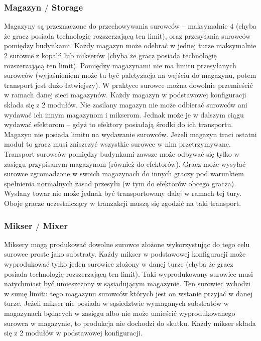 \documentclass[11pt,a4paper]{article}
\begin{document}
\subsubsection{Magazyn $/$ Storage}

Magazyny są przeznaczone do przechowywania surowców -- maksymalnie 4 (chyba że gracz posiada technologię rozszerzającą ten limit), oraz przesyłania surowców pomiędzy budynkami. Każdy magazyn może odebrać w jednej turze maksymalnie 2 surowce z kopalń lub mikserów (chyba że gracz posiada technologię rozszerzającą ten limit). Pomiędzy magazynami nie ma limitu przesyłanych surowców (wyjaśnieniem może tu być paletyzacja na wejściu do magazynu, potem transport jest dużo łatwiejszy). W praktyce surowce można dowolnie przemieścić w ramach danej sieci magazynów. Każdy magazyn w podstawowej konfiguracji składa się z 2 modułów. Nie zasilany magazyn nie może odbierać surowców ani wydawać ich innym magazynom i mikserom. Jednak może je w dalszym ciągu wydawać efektorom -- gdyż to efektory posiadają środki do ich transportu. Magazyn nie posiada limitu na wydawanie surowców. Jeżeli magazyn traci ostatni moduł to gracz musi zniszczyć wszystkie surowce w nim przetrzymywane. Transport surowców pomiędzy budynkami zawsze może odbywać się tylko w zasięgu przypisanym magazynom (również do efektorów). Gracz może wysyłać surowce zgromadzone w swoich magazynach do innych graczy pod warunkiem spełnienia normalnych zasad przesyłu (w tym do efektorów obcego gracza). Wysłany towar nie może jednak być transportowany dalej w ramach tej tury. Oboje gracze uczestniczący w tranzakcji muszą się zgodzić na taki transport.

\subsubsection{Mikser $/$ Mixer}

Miksery mogą produkować dowolne surowce złożone wykorzystując do tego celu surowce proste jako substraty. Każdy mikser w podstawowej konfiguracji może wyprodukować tylko jeden surowiec złożony w danej turze (chyba że gracz posiada technologię rozszerzającą ten limit). Taki wyprodukowany surowiec musi natychmiast być umieszczony w sąsiadującym magazynie. Ten surowiec wchodzi w sumę limitu tego magazynu surowców których jest on wstanie przyjać w danej turze. Jeżeli mikser nie posiada w sąsiedztwie wymaganych substratów w magazynach będących w zasięgu albo nie może umieścić wyprodukowanego surowca w magazynie, to produkcja nie dochodzi do skutku. Każdy mikser składa się z 2 modułów w podstawowej konfiguracji.
\end{document}
